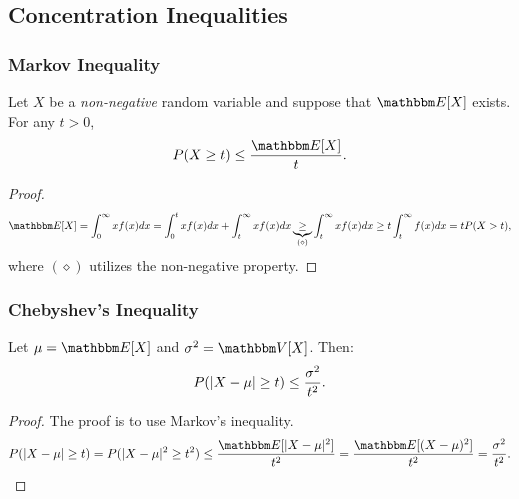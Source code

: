 \subsection{Concentration Inequalities}
    \subsubsection{Markov Inequality}
     Let $X$ be a \emph{non-negative} random variable and suppose that $\E[X]$ exists. 
     For any $t > 0$,
        \begin{equation}
            P(X \ge t) \le \frac{\E[X]}{t}.
        \end{equation}
    \begin{proof}
        \begin{equation}
            \E[X] = \int_{0}^{\infty}{ x f(x)} dx = \int_{0}^{t} x f(x) dx + \int_{t}^{\infty} x f(x) dx \underbrace{\ge}_{(\diamond)} \int_{t}^{\infty} x f(x) dx \ge t \int_{t}^{\infty} f(x) dx = t P(X > t),
        \end{equation}
    where $(\diamond)$ utilizes the non-negative property.
    \end{proof}
    
    \subsubsection{Chebyshev's Inequality}
    Let $\mu = \E[X]$ and $\sigma^2 = \Var[X]$.
    Then:
        \begin{equation}
            P(| X - \mu | \ge t) \le \frac{\sigma^2}{t^2}.
        \end{equation}
    \begin{proof}
        The proof is to use Markov's inequality.
        \begin{equation}
            P(\Abs{X - \mu} \ge t) = P(\Abs{X - \mu}^2 \ge t^2) \le \frac{\E[\Abs{X - \mu}^2]}{t^2} =  \frac{\E[(X - \mu)^2]}{t^2} = \frac{\sigma^2}{t^2}.
        \end{equation}
    \end{proof}
    
